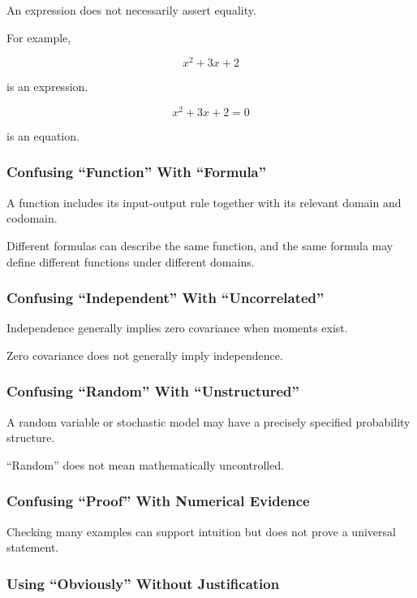 An expression does not necessarily assert equality.

For example,

\[
x^2+3x+2
\]

is an expression.

\[
x^2+3x+2=0
\]

is an equation.

\subsubsection{Confusing ``Function'' With ``Formula''}

A function includes its input-output rule together with its relevant domain
and codomain.

Different formulas can describe the same function, and the same formula may
define different functions under different domains.

\subsubsection{Confusing ``Independent'' With ``Uncorrelated''}

Independence generally implies zero covariance when moments exist.

Zero covariance does not generally imply independence.

\subsubsection{Confusing ``Random'' With ``Unstructured''}

A random variable or stochastic model may have a precisely specified
probability structure.

``Random'' does not mean mathematically uncontrolled.

\subsubsection{Confusing ``Proof'' With Numerical Evidence}

Checking many examples can support intuition but does not prove a universal
statement.

\subsubsection{Using ``Obviously'' Without Justification}

